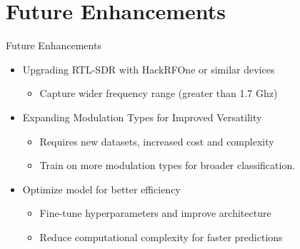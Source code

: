 \section{Future Enhancements}

\begin{frame}[c]{Future Enhancements}
    \begin{itemize}
        \item Upgrading RTL-SDR with HackRFOne or similar devices \vfill
        \begin{itemize}
            \item Capture wider frequency range (greater than 1.7 Ghz) \vfill
        \end{itemize}
        \item Expanding Modulation Types for Improved Versatility \vfill
        \begin{itemize}
            \item Requires new datasets, increased cost and complexity \vfill
            \item Train on more modulation types for broader classification. \vfill
        \end{itemize}

        \item Optimize model for better efficiency \vfill
        \begin{itemize}
            \item Fine-tune hyperparameters and improve architecture \vfill
            \item Reduce computational complexity for faster predictions \vfill
        \end{itemize}

    \end{itemize}
\end{frame}